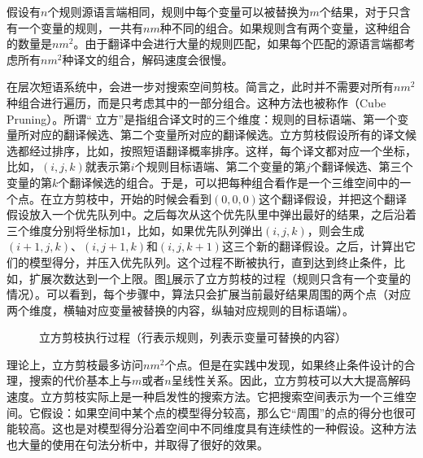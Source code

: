 \parinterval 假设有$n$个规则源语言端相同，规则中每个变量可以被替换为$m$个结果，对于只含有一个变量的规则，一共有$nm$种不同的组合。如果规则含有两个变量，这种组合的数量是$n{m}^2$。由于翻译中会进行大量的规则匹配，如果每个匹配的源语言端都考虑所有$n{m}^2$种译文的组合，解码速度会很慢。

\parinterval 在层次短语系统中，会进一步对搜索空间剪枝。简言之，此时并不需要对所有$n{m}^2$种组合进行遍历，而是只考虑其中的一部分组合。这种方法也被称作{\small{}}（Cube Pruning）。所谓`` 立方''是指组合译文时的三个维度：规则的目标语端、第一个变量所对应的翻译候选、第二个变量所对应的翻译候选。立方剪枝假设所有的译文候选都经过排序，比如，按照短语翻译概率排序。这样，每个译文都对应一个坐标，比如，$(i,j,k)$就表示第$i$个规则目标语端、第二个变量的第$j$个翻译候选、第三个变量的第$k$个翻译候选的组合。于是，可以把每种组合看作是一个三维空间中的一个点。在立方剪枝中，开始的时候会看到$(0,0,0)$这个翻译假设，并把这个翻译假设放入一个优先队列中。之后每次从这个优先队里中弹出最好的结果，之后沿着三个维度分别将坐标加1，比如，如果优先队列弹出$(i,j,k)$，则会生成$(i+1,j,k)$、$(i,j+1,k)$和$(i,j,k+1)$这三个新的翻译假设。之后，计算出它们的模型得分，并压入优先队列。这个过程不断被执行，直到达到终止条件，比如，扩展次数达到一个上限。图\ref{fig:4-40}展示了立方剪枝的过程（规则只含有一个变量的情况）。可以看到，每个步骤中，算法只会扩展当前最好结果周围的两个点（对应两个维度，横轴对应变量被替换的内容，纵轴对应规则的目标语端）。

\begin{figure}[htp]
\centering

\caption{立方剪枝执行过程（行表示规则，列表示变量可替换的内容）}
\label{fig:4-40}
\end{figure}

\parinterval 理论上，立方剪枝最多访问$n{m}^2$个点。但是在实践中发现，如果终止条件设计的合理，搜索的代价基本上与$m$或者$n$呈线性关系。因此，立方剪枝可以大大提高解码速度。立方剪枝实际上是一种启发性的搜索方法。它把搜索空间表示为一个三维空间。它假设：如果空间中某个点的模型得分较高，那么它``周围''的点的得分也很可能较高。这也是对模型得分沿着空间中不同维度具有连续性的一种假设。这种方法也大量的使用在句法分析中，并取得了很好的效果。


